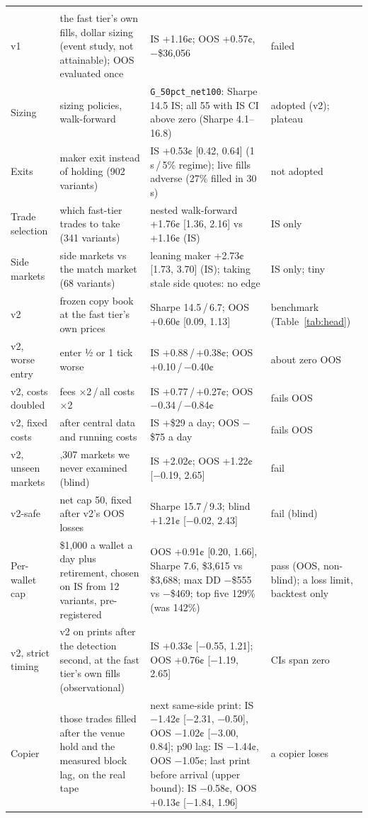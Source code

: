 \documentclass[11pt,letterpaper]{article}
\begin{document}
{\begin{longtable}{@{}>{\raggedright\arraybackslash}p{1.12in}>{\raggedright\arraybackslash}p{1.72in}>{\raggedright\arraybackslash}p{2.4in}>{\raggedright\arraybackslash}p{0.92in}@{}}
\multicolumn{4}{@{}l}{\emph{Copying the fast tier (v2 and relatives)}} \\
v1 & the fast tier's own fills, dollar sizing (event study, not attainable); OOS evaluated once & IS +1.16¢; OOS +0.57¢, −\$36,056 & failed \\
Sizing & 55 sizing policies, walk-forward & \texttt{G\_50pct\_net100}: Sharpe 14.5 IS; all 55 with IS CI above zero (Sharpe 4.1–16.8) & adopted (v2); plateau \\
Exits & maker exit instead of holding (902 variants) & IS +0.53¢ [0.42, 0.64] (1\,s\,/\,5\% regime); live fills adverse (27\% filled in 30\,s) & not adopted \\
Trade selection & which fast-tier trades to take (341 variants) & nested walk-forward +1.76¢ [1.36, 2.16] vs +1.16¢ (IS) & IS only \\
Side markets & side markets vs the match market (68 variants) & leaning maker +2.73¢ [1.73, 3.70] (IS); taking stale side quotes: no edge & IS only; tiny \\
v2 & frozen copy book at the fast tier's own prices & Sharpe 14.5\,/\,6.7; OOS +0.60¢ [0.09, 1.13] & benchmark (Table~\ref{tab:head}) \\
v2, worse entry & enter ½ or 1 tick worse & IS +0.88\,/\,+0.38¢; OOS +0.10\,/\,−0.40¢ & about zero OOS \\
v2, costs doubled & fees $\times$2\,/\,all costs $\times$2 & IS +0.77\,/\,+0.27¢; OOS −0.34\,/\,−0.84¢ & fails OOS \\
v2, fixed costs & after central data and running costs & IS +\$29 a day; OOS −\$75 a day & fails OOS \\
v2, unseen markets & 11,307 markets we never examined (blind) & IS +2.02¢; OOS +1.22¢ [−0.19, 2.65] & fail \\
v2-safe & net cap 50, fixed after v2's OOS losses & Sharpe 15.7\,/\,9.3; blind +1.21¢ [−0.02, 2.43] & fail (blind) \\
Per-wallet cap & \$1,000 a wallet a day plus retirement, chosen on IS from 12 variants, pre-registered & OOS +0.91¢ [0.20, 1.66], Sharpe 7.6, \$3,615 vs \$3,688; max DD −\$555 vs −\$469; top five 129\% (was 142\%) & pass (OOS, non-blind); a loss limit, backtest only \\
v2, strict timing & v2 on prints after the detection second, at the fast tier's own fills (observational) & IS +0.33¢ [−0.55, 1.21]; OOS +0.76¢ [−1.19, 2.65] & CIs span zero \\
Copier & those trades filled after the venue hold and the measured block lag, on the real tape & next same-side print: IS −1.42¢ [−2.31, −0.50], OOS −1.02¢ [−3.00, 0.84]; p90 lag: IS −1.44¢, OOS −1.05¢; last print before arrival (upper bound): IS −0.58¢, OOS +0.13¢ [−1.84, 1.96] & a copier loses \\

\end{longtable}}
\end{document}
